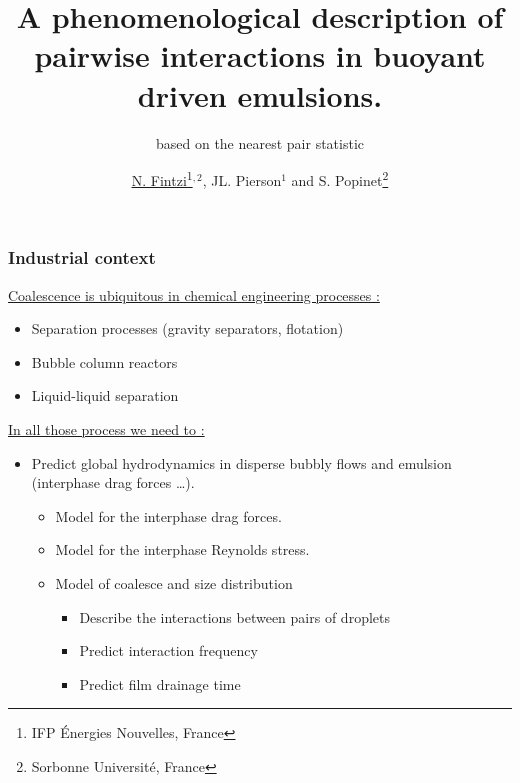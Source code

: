 \documentclass{sintefbeamer}
\title{A phenomenological description of pairwise interactions in buoyant driven emulsions.}
\subtitle{based on the nearest pair statistic}
\author{\href{http://basilisk.fr/sandbox/fintzin/Rising-Suspenion/RS.c}{\underline{N. Fintzi}\footnote{IFP \'Energies Nouvelles, France}$^{,2}$}, JL. Pierson$^1$ and S. Popinet\footnote{Sorbonne Universit\'e, France}}
\begin{document}
\maketitle

\begin{frame}
  \frametitle{Industrial context}
  \underline{Coalescence is ubiquitous in chemical engineering processes :}
  \begin{itemize}
    \item Separation processes (gravity separators, flotation)
    \item Bubble column reactors
    \item Liquid-liquid separation
  \end{itemize}
  \vfill
  \underline{In all those process we need to : }
  \begin{itemize}
    \item Predict global hydrodynamics in disperse bubbly flows and emulsion (interphase drag forces \ldots).
    \begin{itemize}
      \item Model for the interphase drag forces.
      \item Model for the interphase Reynolds stress.
      \item Model of coalesce and size distribution 
      \begin{itemize}
        \item Describe the interactions between pairs of droplets
        \item Predict interaction frequency
        \item Predict film drainage time 
      \end{itemize}
    \end{itemize}
  \end{itemize}

  \vfill

\end{frame}
\end{document}
